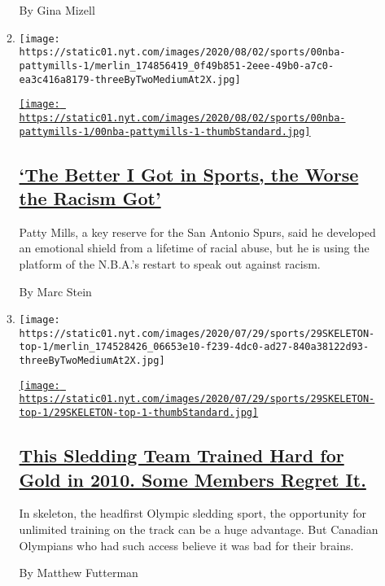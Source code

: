 \begin{enumerate}
\begin{enumerate}
    By Gina Mizell
  \item
    \texttt{[image: https://static01.nyt.com/images/2020/08/02/sports/00nba-pattymills-1/merlin\_174856419\_0f49b851-2eee-49b0-a7c0-ea3c416a8179-threeByTwoMediumAt2X.jpg]}

    \href{/2020/07/31/sports/basketball/spurs-patty-mills.html}{\texttt{[image: https://static01.nyt.com/images/2020/08/02/sports/00nba-pattymills-1/00nba-pattymills-1-thumbStandard.jpg]}}

    \hypertarget{the-better-i-got-in-sports-the-worse-the-racism-got}{%
    \subsection{\texorpdfstring{\href{/2020/07/31/sports/basketball/spurs-patty-mills.html}{`The
    Better I Got in Sports, the Worse the Racism
    Got'}}{`The Better I Got in Sports, the Worse the Racism Got'}}\label{the-better-i-got-in-sports-the-worse-the-racism-got}}

    Patty Mills, a key reserve for the San Antonio Spurs, said he
    developed an emotional shield from a lifetime of racial abuse, but
    he is using the platform of the N.B.A.'s restart to speak out
    against racism.

    By Marc Stein
  \item
    \texttt{[image: https://static01.nyt.com/images/2020/07/29/sports/29SKELETON-top-1/merlin\_174528426\_06653e10-f239-4dc0-ad27-840a38122d93-threeByTwoMediumAt2X.jpg]}

    \href{/2020/08/01/sports/olympics/concussion-skeleton-sledding-brain-damage.html}{\texttt{[image: https://static01.nyt.com/images/2020/07/29/sports/29SKELETON-top-1/29SKELETON-top-1-thumbStandard.jpg]}}

    \hypertarget{this-sledding-team-trained-hard-for-gold-in-2010-some-members-regret-it}{%
    \subsection{\texorpdfstring{\href{/2020/08/01/sports/olympics/concussion-skeleton-sledding-brain-damage.html}{This
    Sledding Team Trained Hard for Gold in 2010. Some Members Regret
    It.}}{This Sledding Team Trained Hard for Gold in 2010. Some Members Regret It.}}\label{this-sledding-team-trained-hard-for-gold-in-2010-some-members-regret-it}}

    In skeleton, the headfirst Olympic sledding sport, the opportunity
    for unlimited training on the track can be a huge advantage. But
    Canadian Olympians who had such access believe it was bad for their
    brains.

    By Matthew Futterman
  \end{enumerate}
\end{enumerate}

